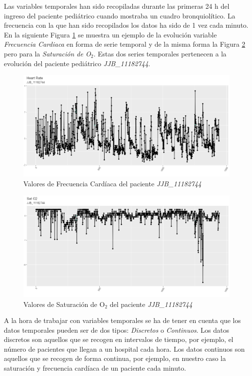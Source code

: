 Las variables temporales han sido recopiladas durante las primeras 24 h del ingreso del paciente pediátrico cuando mostraba un cuadro bronquiolítico. La frecuencia con la que han sido recopilados los datos ha sido de 1 vez cada minuto. En la siguiente Figura \ref{fig:fc-JJB} se muestra un ejemplo de la evolución  variable \textit{Frecuencia Cardiaca} en forma de serie temporal y de la misma forma la Figura \ref{fig:satO2-JJB} pero para la \textit{Saturación de O$_2$}. Estas dos series temporales pertenecen a la evolución del paciente pediátrico \textit{JJB\_11182744}.

\begin{figure}[H]
    \centering
    \includegraphics[scale=0.70]{./img/Heart-Rate-JJB.png}
    \caption{Valores de Frecuencia Cardíaca del paciente \textit{JJB\_11182744}}
    \label{fig:fc-JJB}
\end{figure}

\begin{figure}[H]
    \centering
    \includegraphics[scale=0.70]{./img/SatO2-JJB.png}
    \caption{Valores de Saturación de O$_2$ del paciente \textit{JJB\_11182744}}
    \label{fig:satO2-JJB}
\end{figure}

A la hora de trabajar con variables temporales se ha de tener en cuenta que los datos temporales pueden ser de dos tipos: \textit{Discretos} o \textit{Continuos}. Los datos discretos son aquellos que se recogen en intervalos de tiempo, por ejemplo, el número de pacientes que llegan a un hospital cada hora. Los datos continuos son aquellos que se recogen de forma continua, por ejemplo, en nuestro caso la saturación y frecuencia cardíaca de un paciente cada minuto.


